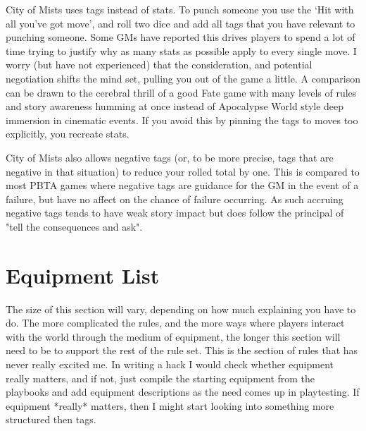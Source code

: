 \documentclass{tufte-handout}
\begin{document}
City of Mists uses tags instead of stats. To punch someone you use the `Hit with all you've got move', and roll two dice and add all tags that you have relevant to punching someone. Some GMs have reported this drives players to spend a lot of time trying to justify why as many stats as possible apply to every single move. I worry (but have not experienced) that the consideration, and potential negotiation shifts the mind set, pulling you out of the game a little. A comparison can be drawn to the cerebral thrill of a good Fate game with many levels of rules and story awareness humming at once instead of Apocalypse World style deep immersion in cinematic events. If you avoid this by pinning the tags to moves too explicitly, you recreate stats.

City of Mists also allows negative tags (or, to be more precise, tags that are negative in that situation) to reduce your rolled total by one. This is compared to most PBTA games where negative tags are guidance for the GM in the event of a failure, but have no affect on the chance of failure occurring. As such accruing negative tags tends to have weak story impact but does follow the principal of "tell the consequences and ask". 

\section{Equipment List}

The size of this section will vary, depending on how much explaining you have to do. The more complicated the rules, and the more ways where players interact with the world through the medium of equipment, the longer this section will need to be to support the rest of the rule set.
This is the section of rules that has never really excited me. In writing a hack I would check whether equipment really matters, and if not, just compile the starting equipment from the playbooks and add equipment descriptions as the need comes up in playtesting. If equipment *really* matters, then I might start looking into something more structured then tags. 
\end{document}
